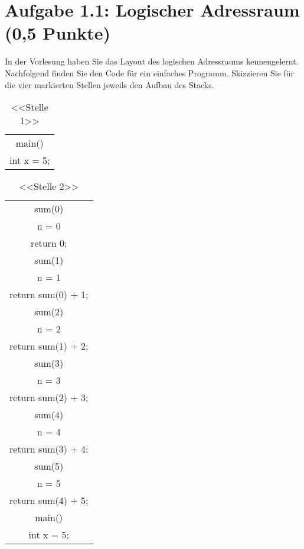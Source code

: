 \documentclass[a4paper,12pt]{article}
\begin{document}
\section*{Aufgabe 1.1: Logischer Adressraum (0,5 Punkte)}

	In der Vorlesung haben Sie das Layout des logischen Adressraums kennengelernt. Nachfolgend finden Sie
den Code für ein einfaches Programm. Skizzieren Sie für die vier markierten Stellen jeweils den Aufbau
des Stacks.
\begin{table}
	\begin{center}
		\begin{tabular}{|c|}
	\\ 
	\hline main() \\ int x = 5;
	\\ 
	\hline 
		\end{tabular}
	\end{center}
 \caption*{<<Stelle 1>>}
\end{table}
\vspace{\baselineskip}
\vspace{\baselineskip}


\begin{table}
	\begin{center}
		\begin{tabular}{|c|}
			\\ 
			\hline sum(0) \\ n = 0 \\ return 0;\\
			\hline sum(1) \\ n = 1 \\ return sum(0) + 1;\\
			\hline sum(2) \\ n = 2 \\ return sum(1) + 2;\\
			\hline sum(3) \\ n = 3 \\ return sum(2) + 3;\\
			\hline sum(4) \\ n = 4 \\ return sum(3) + 4;\\
			\hline sum(5) \\ n = 5 \\ return sum(4) + 5;\\
			\hline main() \\ int x = 5;\\
			\hline 
		\end{tabular}
	\end{center}
	\caption*{<<Stelle 2>>}
\end{table}
\end{document}
